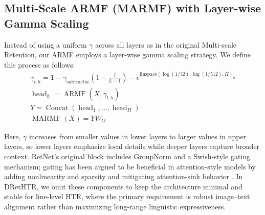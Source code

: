 \documentclass[times, review, 10pt]{elsarticle}
\begin{document}
\subsection{Multi-Scale ARMF (MARMF) with Layer-wise Gamma Scaling}
\label{sec:marmf}
Instead of using a uniform \(\gamma\) across all layers as in the original Multi-scale Retention, our ARMF employs a layer-wise gamma scaling strategy. We define this process as follows:
\begin{equation}
\begin{gathered}
\gamma_{l,h} = 1 - \gamma_{\text{subtractor}}\!\left(1 - \frac{l}{L-1}\right) - e^{\text{linspace}(\log(1/32), \log(1/512), H)_h} \\
\operatorname{head}_h = \operatorname{ARMF}\left(X, \gamma_{l,h}\right) \\
Y = \operatorname{Concat}\left(\operatorname{head}_1, \ldots, \operatorname{head}_H\right) \\
\operatorname{MARMF}(X) = Y W_O
\end{gathered}
\end{equation}

Here, $\gamma$ increases from smaller values in lower layers to larger values in upper layers, so lower layers emphasize local details while deeper layers capture broader context. RetNet’s original block includes GroupNorm and a Swish-style gating mechanism; gating has been argued to be beneficial in attention-style models by adding nonlinearity and sparsity and mitigating attention-sink behavior \cite{qiu2025gatedattention}. In DRetHTR, we omit these components to keep the architecture minimal and stable for line-level HTR, where the primary requirement is robust image--text alignment rather than maximizing long-range linguistic expressiveness.

\end{document}
